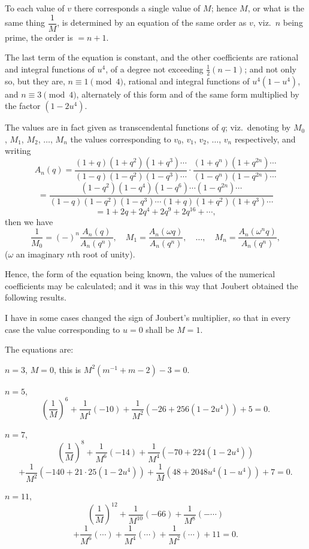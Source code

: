\documentclass[11pt,a4paper]{book}
\begin{document}
To each value of $v$ there corresponds a single value of $M$; hence $M$, or what is the same thing $\dfrac{1}{M}$, is determined by an equation of the same order as $v$, viz.\ $n$ being prime, the order is $= n + 1$.

The last term of the equation is constant, and the other coefficients are rational and integral functions of $u^4$, of a degree not exceeding $\frac{1}{2}(n - 1)$; and not only so, but they are, $n \equiv 1 \pmod{4}$, rational and integral functions of $u^4(1 - u^4)$, and $n \equiv 3 \pmod{4}$, alternately of this form and of the same form multiplied by the factor $(1 - 2u^4)$.

The values are in fact given as transcendental functions of $q$; viz.\ denoting by $M_0$, $M_1$, $M_2$, $\ldots$, $M_n$ the values corresponding to $v_0$, $v_1$, $v_2$, $\ldots$, $v_n$ respectively, and writing
\[
A_n(q) = \frac{(1 + q)(1 + q^2)(1 + q^3)\cdots}{(1 - q)(1 - q^2)(1 - q^3)\cdots} \cdot \frac{(1 + q^n)(1 + q^{2n})\cdots}{(1 - q^n)(1 - q^{2n})\cdots}
\]
\[
= \frac{(1 - q^2)(1 - q^4)(1 - q^6)\cdots(1 - q^{2n})\cdots}{(1 - q)(1 - q^2)(1 - q^3)\cdots(1 + q)(1 + q^2)(1 + q^3)\cdots}
\]
\[
= 1 + 2q + 2q^4 + 2q^9 + 2q^{16} + \cdots,
\]
then we have
\[
\frac{1}{M_0} = (-)^n \frac{A_n(q)}{A_n(q^n)}, \quad
M_1 = \frac{A_n(\omega q)}{A_n(q^n)}, \quad \ldots, \quad
M_n = \frac{A_n(\omega^n q)}{A_n(q^n)},
\]
($\omega$ an imaginary $n$th root of unity).

Hence, the form of the equation being known, the values of the numerical coefficients may be calculated; and it was in this way that Joubert obtained the following results.

I have in some cases changed the sign of Joubert's multiplier, so that in every case the value corresponding to $u = 0$ shall be $M = 1$.

The equations are:

$n = 3$, $M = 0$, this is $M^2(m^{-1} + m - 2) - 3 = 0$.

\medskip
$n = 5$,
\[
\left(\frac{1}{M}\right)^6 + \frac{1}{M^4}(-10) + \frac{1}{M^2}(-26 + 256(1 - 2u^4)) + 5 = 0.
\]

\medskip
$n = 7$,
\[
\left(\frac{1}{M}\right)^8 + \frac{1}{M^6}(-14) + \frac{1}{M^4}(-70 + 224(1 - 2u^4))
\]
\[
+ \frac{1}{M^2}(-140 + 21 \cdot 25(1 - 2u^4)) + \frac{1}{M}(48 + 2048u^4(1 - u^4)) + 7 = 0.
\]

\medskip
$n = 11$,
\[
\left(\frac{1}{M}\right)^{12} + \frac{1}{M^{10}}(-66) + \frac{1}{M^8}(-\cdots)
\]
\[
+ \frac{1}{M^6}(\cdots) + \frac{1}{M^4}(\cdots) + \frac{1}{M^2}(\cdots) + 11 = 0.
\]
\end{document}
